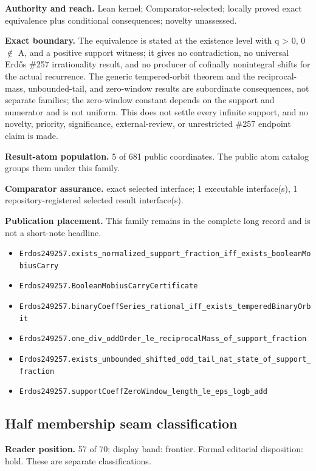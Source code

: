 \textbf{Authority and reach.} Lean kernel; Comparator-selected; locally proved exact equivalence plus conditional consequences; novelty unassessed.

\textbf{Exact boundary.} The equivalence is stated at the existence level with q > 0, 0 \ensuremath{\notin} A, and a positive support witness; it gives no contradiction, no universal Erdős \#257 irrationality result, and no producer of cofinally nonintegral shifts for the actual recurrence. The generic tempered-orbit theorem and the reciprocal-mass, unbounded-tail, and zero-window results are subordinate consequences, not separate families; the zero-window constant depends on the support and numerator and is not uniform. This does not settle every infinite support, and no novelty, priority, significance, external-review, or unrestricted \#257 endpoint claim is made.

\textbf{Result-atom population.} 5 of 681 public coordinates. The public atom catalog groups them under this family.

\textbf{Comparator assurance.} exact selected interface; 1 executable interface(s), 1 repository-registered selected result interface(s).

\textbf{Publication placement.} This family remains in the complete long record and is not a short-note headline.

\begin{itemize}
  \item \nolinkurl{Erdos249257.exists_normalized_support_fraction_iff_exists_booleanMobiusCarry}
  \item \nolinkurl{Erdos249257.BooleanMobiusCarryCertificate}
  \item \nolinkurl{Erdos249257.binaryCoeffSeries_rational_iff_exists_temperedBinaryOrbit}
  \item \nolinkurl{Erdos249257.one_div_oddOrder_le_reciprocalMass_of_support_fraction}
  \item \nolinkurl{Erdos249257.exists_unbounded_shifted_odd_tail_nat_state_of_support_fraction}
  \item \nolinkurl{Erdos249257.supportCoeffZeroWindow_length_le_eps_logb_add}
\end{itemize}

\subsection{Half membership seam classification}
\textbf{Reader position.} 57 of 70; display band: frontier.  Formal editorial disposition: hold.  These are separate classifications.


